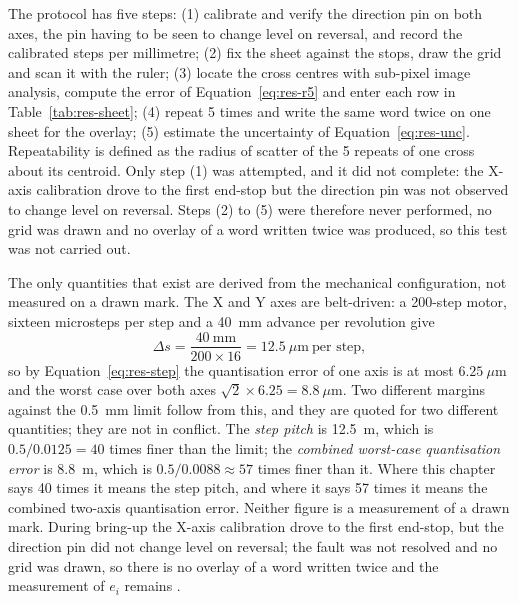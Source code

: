             The protocol has five steps: (1) calibrate and verify the direction pin on both axes, the pin having to be seen to change level on reversal, and record the calibrated steps per millimetre; (2) fix the sheet against the stops, draw the grid and scan it with the ruler; (3) locate the cross centres with sub-pixel image analysis, compute the error of Equation~\ref{eq:res-r5} and enter each row in Table~\ref{tab:res-sheet}; (4) repeat 5 times and write the same word twice on one sheet for the overlay; (5) estimate the uncertainty of Equation~\ref{eq:res-unc}.
            Repeatability is defined as the radius of scatter of the 5 repeats of one cross about its centroid.
            Only step (1) was attempted, and it did not complete: the X-axis calibration drove to the first end-stop but the direction pin was not observed to change level on reversal. Steps (2) to (5) were therefore never performed, no grid was drawn and no overlay of a word written twice was produced, so this test was not carried out.


            The only quantities that exist are derived from the mechanical configuration, not measured on a drawn mark.
            The X and Y axes are belt-driven: a 200-step motor, sixteen microsteps per step and a 40~mm advance per revolution give
            \begin{equation}
            \label{eq:res-step}
            \Delta s=\frac{40\ \mathrm{mm}}{200\times16}=12.5\ \mu\mathrm{m}\ \text{per step},
            \end{equation}
            so by Equation~\ref{eq:res-step} the quantisation error of one axis is at most $6.25~\mu$m and the worst case over both axes $\sqrt{2}\times6.25=8.8~\mu$m.
            Two different margins against the 0.5~mm limit follow from this, and they are quoted for two different quantities; they are not in conflict.
            The \emph{step pitch} is 12.5~\textmu m, which is $0.5/0.0125=40$ times finer than the limit; the \emph{combined worst-case quantisation error} is 8.8~\textmu m, which is $0.5/0.0088\approx57$ times finer than it.
            Where this chapter says 40 times it means the step pitch, and where it says 57 times it means the combined two-axis quantisation error.
            Neither figure is a measurement of a drawn mark.
            During bring-up the X-axis calibration drove to the first end-stop, but the direction pin did not change level on reversal; the fault was not resolved and no grid was drawn, so there is no overlay of a word written twice and the measurement of $e_i$ remains \nym{}.

